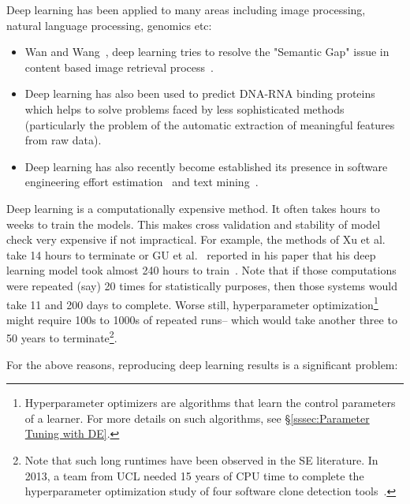 \documentclass[sigconf]{acmart}
\newcommand{\bi}{\begin{itemize}[leftmargin=0.4cm]}
\newcommand{\ei}{\end{itemize}}
\theoremstyle{break}
\begin{document}
    Deep learning has been applied to many areas including
    image processing, natural language processing, genomics etc:
    \bi
    \item Wan and Wang~\cite{wan2014deep},  deep learning tries to resolve the "Semantic Gap" issue in content based image retrieval process~\cite{smeulders2000content}.
    \item
    Deep learning has also been  used to predict DNA-RNA binding proteins~\cite{alipanahi2015predicting} which helps to solve problems faced by less sophisticated methods (particularly the problem of the automatic extraction of meaningful features from raw data).
  \item
    Deep learning has also recently become established its presence in software engineering effort
    estimation~\cite{Choetkiertikul18} and text mining~\cite{choetkiertikul2016deep,mou2016convolutional,white2016deep,white2015toward,yuan2014droid,yang2015deep}. 
    \ei
    Deep learning is a computationally expensive method.  It often takes hours to weeks to train the models. This makes cross validation and stability of model check very expensive if not impractical. For example, the methods of Xu et al. take 14 hours to terminate or GU et al.~\cite{gu2016deep} reported in his paper that his deep learning model took almost 240 hours to train~\cite{gu2016deep}.  Note that if those computations were repeated (say) 20 times for statistically purposes, then those systems would take 11 and 200 days to complete. Worse still, hyperparameter optimization\footnote{
    Hyperparameter optimizers are algorithms that learn the control parameters of a learner.
    For more details on such algorithms, see \S\ref{sssec:Parameter Tuning with DE}.}
    might require 100s to 1000s of repeated runs-- which would take another three to 50 years to terminate\footnote{Note
    that such long runtimes have   been observed in the SE literature. In 2013, a team from UCL needed 15 years of CPU time to complete the hyperparameter optimization study of four software clone detection tools~\cite{Wang13s}.}.
    
For the above reasons, reproducing   deep learning results is a significant problem:
    
\end{document}
